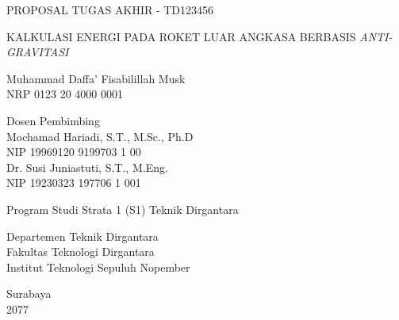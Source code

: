\begin{large}
  PROPOSAL TUGAS AKHIR - TD123456
\end{large}

\vspace{\fill}

\begin{spacing}{1.5}
  \begin{Large}
    KALKULASI ENERGI PADA ROKET LUAR 
    ANGKASA BERBASIS \emph{ANTI-GRAVITASI}
  \end{Large}
\end{spacing}

\vspace{\fill}

\begin{large}
  Muhammad Daffa' Fisabilillah Musk \\
  \textmd{NRP 0123 20 4000 0001}
\end{large}

\vspace{\fill}

\begin{large}
  \textmd{Dosen Pembimbing} \\
  Mochamad Hariadi, S.T., M.Sc., Ph.D \\
  \textmd{NIP 19969120 9199703 1 00} \\
  Dr. Susi Juniastuti, S.T., M.Eng. \\
  \textmd{NIP 19230323 197706 1 001}
\end{large}

\vspace{\fill}

Program Studi Strata 1 (S1) Teknik Dirgantara \\

\mdseries

Departemen Teknik Dirgantara \\
Fakultas Teknologi Dirgantara \\
Institut Teknologi Sepuluh Nopember

Surabaya \\
2077
